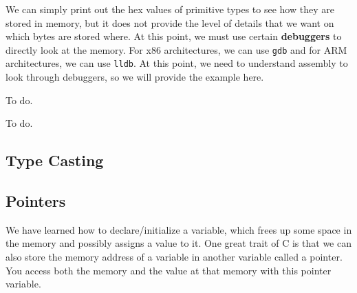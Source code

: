 \documentclass{article}
\begin{document}
    We can simply print out the hex values of primitive types to see how they are stored in memory, but it does not provide the level of details that we want on which bytes are stored where. At this point, we must use certain \textbf{debuggers} to directly look at the memory. For x86 architectures, we can use \texttt{gdb} and for ARM architectures, we can use \texttt{lldb}. At this point, we need to understand assembly to look through debuggers, so we will provide the example here. 

    \begin{example}
      To do. 
    \end{example}

    \begin{example}
      To do. 
    \end{example}

  \subsection{Type Casting}


  \subsection{Pointers}

    We have learned how to declare/initialize a variable, which frees up some space in the memory and possibly assigns a value to it. One great trait of C is that we can also store the memory address of a variable in another variable called a pointer. You access both the memory and the value at that memory with this pointer variable. 
\end{document}
